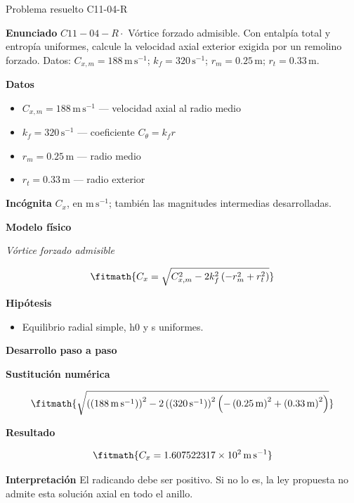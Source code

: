 \documentclass[10pt,openany]{book}
\begin{document}
\begin{studiumworked}{Problema resuelto C11-04-R}


\noindent\textbf{Enunciado}
\(C11-04-R \cdot\) Vórtice forzado admisible. Con entalpía total y entropía uniformes, calcule la velocidad axial exterior exigida por un remolino forzado. Datos: \(C_{x,m}=188\, \mathrm{m}\,\mathrm{s}^{-1}\); \(k_f=320\, \mathrm{s}^{-1}\); \(r_m=0.25\, \mathrm{m}\); \(r_t=0.33\, \mathrm{m}\).

\noindent\textbf{Datos}
\begin{itemize}
\item $C_{x,m} = 188\,\mathrm{m}\,\mathrm{s}^{-1}$ — velocidad axial al radio medio
\item $k_f = 320\,\mathrm{s}^{-1}$ — coeficiente $C_\theta=k_f r$
\item $r_m = 0.25\,\mathrm{m}$ — radio medio
\item $r_t = 0.33\,\mathrm{m}$ — radio exterior
\end{itemize}

\noindent\textbf{Incógnita}
$C_x$, en $\mathrm{m\,s^{-1}}$; también las magnitudes intermedias desarrolladas.

\noindent\textbf{Modelo físico}

\noindent\textit{Vórtice forzado admisible}

\[
\fitmath{C_x=\sqrt{C_{x,m}^{2} - 2 k_f^{2} \left(- r_m^{2} + r_t^{2}\right)}}
\]

\noindent\textbf{Hipótesis}
\begin{itemize}
\item Equilibrio radial simple, h0 y s uniformes.
\end{itemize}

\noindent\textbf{Desarrollo paso a paso}



\noindent\textbf{Sustitución numérica}

\[
\fitmath{\sqrt{\left(\left(188\,\mathrm{m}\,\mathrm{s}^{-1}\right)\right)^{2} - 2 \left(\left(320\,\mathrm{s}^{-1}\right)\right)^{2} \left(- \left(0.25\,\mathrm{m}\right)^{2} + \left(0.33\,\mathrm{m}\right)^{2}\right)}}
\]

\noindent\textbf{Resultado}

\[
\fitmath{C_x=1.607522317\times10^{2}\,\mathrm{m}\,\mathrm{s}^{-1}}
\]

\noindent\textbf{Interpretación}
El radicando debe ser positivo. Si no lo es, la ley propuesta no admite esta solución axial en todo el anillo.


\end{studiumworked}
\end{document}
